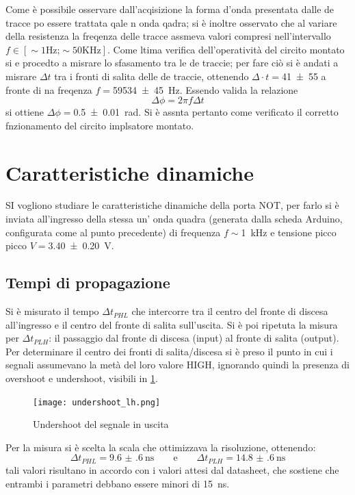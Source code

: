 	Come è possibile osservare dall'acqisizione la forma d'onda presentata dalle de tracce po essere trattata qale n onda qadra; si è inoltre osservato che al variare della resistenza la freqenza delle tracce assmeva valori compresi nell'intervallo $f\in [\sim 1 \text{Hz;} \sim 50 \text{KHz}]$.
	Come ltima verifica dell'operatività del circito montato si e procedto a misrare lo sfasamento tra le de traccie;
	per fare ciò si è andati a misrare $\Delta t$ tra i fronti di salita delle de
	 traccie, ottenendo $\Delta \cdot t=$\SI{41 \pm 55}{\sec} a fronte di na freqenza
	  $f=$\SI{59534 \pm 45}{\hertz}.
	Essendo valida la relazione \begin{equation}
	\Delta \phi = 2 \pi f \Delta t
	\end{equation}\label{eq:sfas}
	si ottiene $\Delta \phi=$\SI{0.5 \pm 0.01}{\radian}.
	Si è assnta pertanto come verificato il corretto fnzionamento del circito implsatore montato.

\section{Caratteristiche dinamiche}
	SI vogliono studiare le caratteristiche dinamiche della porta NOT, per farlo si è inviata all'ingresso della stessa un' onda quadra (generata dalla scheda Arduino, configurata come al punto precedente) di frequenza  $f\sim$\SI{1}{\kilo \hertz} e tensione picco picco $V=$\SI{3.40 \pm 0.20}{\volt}.

	\subsection{Tempi di propagazione}
	Si è misurato il tempo $\Delta t_{PHL}$ che intercorre tra il centro del fronte di discesa all'ingresso e il centro del fronte di salita sull'uscita. Si è poi ripetuta la misura per $\Delta t_{PLH}$: il passaggio dal fronte di discesa (input) al fronte di salita (output).
	Per determinare il centro dei fronti di salita/discesa si è preso il punto in cui i segnali assumevano la metà del loro valore HIGH, ignorando quindi la presenza di overshoot e undershoot, visibili in \figurename{ \ref{f:ripple}}.

	\begin{figure}[H]
		\centering
		\texttt{[image: undershoot\_lh.png]}
		\caption{Undershoot del segnale in uscita}
		\label{f:ripple}
	\end{figure}
	\noindent Per la misura si è scelta la scala che ottimizzava la risoluzione, ottenendo:
	$$\Delta t_{PHL}=\SI{9.6(6)}{\nano \second} \qquad \text{e} \qquad \Delta t_{PLH}=\SI{14.8(6)}{\nano \second}$$
	tali valori risultano in accordo con i valori attesi dal datasheet, che sostiene che entrambi i parametri debbano essere minori di \SI{15}{\nano \second}.
	

